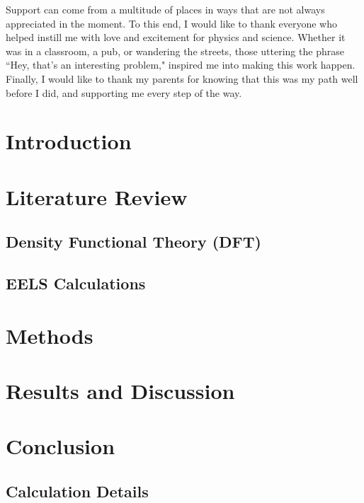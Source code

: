 \documentclass[12pt]{report}
\begin{document}
Support can come from a multitude of places in ways that are not always appreciated in the moment.  To this end, I would like to thank everyone who helped instill me with love and excitement for physics and science.  Whether it was in a classroom, a pub, or wandering the streets, those uttering the phrase ``Hey, that's an interesting problem," inspired me into making this work happen. Finally, I would like to thank my parents for knowing that this was my path well before I did, and supporting me every step of the way. 















\chapter{Introduction}
\renewcommand{\thepage}{\arabic{page}}%
\setcounter{page}{1}%




\chapter{Literature Review}\label{literature_review}

\section{Density Functional Theory (DFT)}\label{dft_section}

\section{EELS Calculations}\label{ELNES_section}

\chapter{Methods}\label{methods}

\chapter{Results and Discussion}\label{results}

\chapter{Conclusion}\label{conclusion}


\begin{appendices}

\chapter{Calculation Details} \label{calc_details}






\end{appendices}


\newpage




\end{document}
